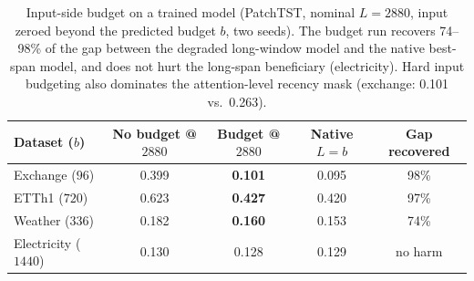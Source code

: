 \begin{table}[!htb]
\caption{Input-side budget on a trained model (PatchTST, nominal $L{=}2880$, input zeroed beyond the predicted budget $b$, two seeds). The budget run recovers 74--98\% of the gap between the degraded long-window model and the native best-span model, and does not hurt the long-span beneficiary (electricity). Hard input budgeting also dominates the attention-level recency mask (exchange: 0.101 vs.\ 0.263).}
\label{tab:budget}
\centering\scriptsize
\begin{tabular}{lcccc}
\toprule
Dataset ($b$) & No budget @$2880$ & Budget @$2880$ & Native $L{=}b$ & Gap recovered \\
\midrule
Exchange ($96$) & 0.399 & \textbf{0.101} & 0.095 & 98\% \\
ETTh1 ($720$) & 0.623 & \textbf{0.427} & 0.420 & 97\% \\
Weather ($336$) & 0.182 & \textbf{0.160} & 0.153 & 74\% \\
Electricity ($1440$) & 0.130 & 0.128 & 0.129 & no harm \\
\bottomrule
\end{tabular}
\end{table}
